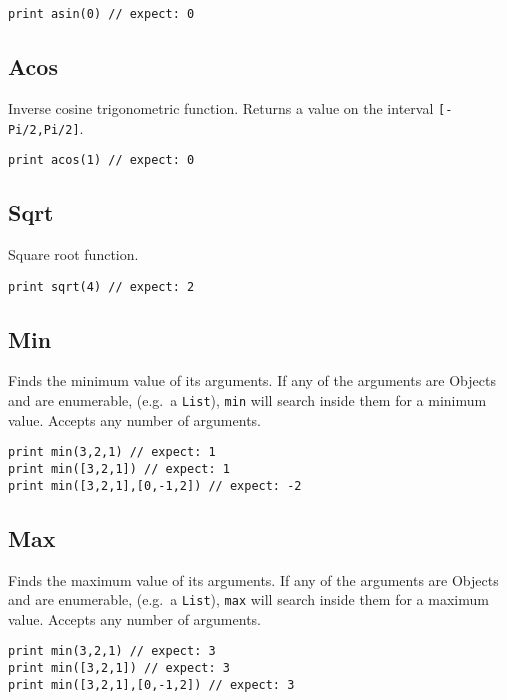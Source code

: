 \begin{lstlisting}
print asin(0) // expect: 0 
\end{lstlisting}

\hypertarget{acos}{%
\subsection{Acos}\label{acos}}

Inverse cosine trigonometric function. Returns a value on the interval
\texttt{{[}-Pi/2,Pi/2{]}}.

\begin{lstlisting}
print acos(1) // expect: 0 
\end{lstlisting}

\hypertarget{sqrt}{%
\subsection{Sqrt}\label{sqrt}}

Square root function.

\begin{lstlisting}
print sqrt(4) // expect: 2
\end{lstlisting}

\hypertarget{min}{%
\subsection{Min}\label{min}}

Finds the minimum value of its arguments. If any of the arguments are
Objects and are enumerable, (e.g.~a \texttt{List}), \texttt{min} will
search inside them for a minimum value. Accepts any number of arguments.

\begin{lstlisting}
print min(3,2,1) // expect: 1 
print min([3,2,1]) // expect: 1 
print min([3,2,1],[0,-1,2]) // expect: -2 
\end{lstlisting}

\hypertarget{max}{%
\subsection{Max}\label{max}}

Finds the maximum value of its arguments. If any of the arguments are
Objects and are enumerable, (e.g.~a \texttt{List}), \texttt{max} will
search inside them for a maximum value. Accepts any number of arguments.

\begin{lstlisting}
print min(3,2,1) // expect: 3 
print min([3,2,1]) // expect: 3
print min([3,2,1],[0,-1,2]) // expect: 3 
\end{lstlisting}

